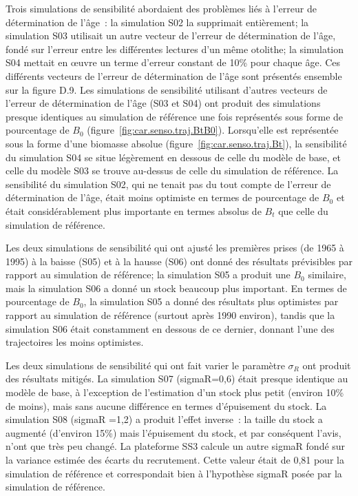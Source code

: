 \documentclass[11pt]{book}
\newcommand{\pc}{\%}
\begin{document}
Trois simulations de sensibilit\'{e} abordaient des probl\`{e}mes li\'{e}s \`{a} l'erreur de d\'{e}termination de l'\^{a}ge~: la simulation S02 la supprimait enti\`{e}rement; la simulation S03 utilisait un autre vecteur de l'erreur de d\'{e}termination de l'\^{a}ge, fond\'{e} sur l'erreur entre les diff\'{e}rentes lectures d'un m\^{e}me otolithe; la simulation S04 mettait en {\oe}uvre un terme d'erreur constant de 10\pc{} pour chaque \^{a}ge.
Ces diff\'{e}rents vecteurs de l'erreur de d\'{e}termination de l'\^{a}ge sont pr\'{e}sent\'{e}s ensemble sur la figure D.9.
Les simulations de sensibilit\'{e} utilisant d'autres vecteurs de l'erreur de d\'{e}termination de l'\^{a}ge (S03 et S04) ont produit des simulations presque identiques au simulation de r\'{e}f\'{e}rence une fois repr\'{e}sent\'{e}s sous forme de pourcentage de $B_0$ (figure~\ref{fig:car.senso.traj.BtB0}).
Lorsqu'elle est repr\'{e}sent\'{e}e sous la forme d'une biomasse absolue (figure~\ref{fig:car.senso.traj.Bt}), la sensibilit\'{e} du simulation S04 se situe l\'{e}g\`{e}rement en dessous de celle du mod\`{e}le de base, et celle du mod\`{e}le S03 se trouve au-dessus de celle du simulation de r\'{e}f\'{e}rence. La sensibilit\'{e} du simulation S02, qui ne tenait pas du tout compte de l'erreur de d\'{e}termination de l'\^{a}ge, \'{e}tait moins optimiste en termes de pourcentage de $B_0$ et \'{e}tait consid\'{e}rablement plus importante en termes absolus de $B_t$ que celle du simulation de r\'{e}f\'{e}rence.

Les deux simulations de sensibilit\'{e} qui ont ajust\'{e} les premi\`{e}res prises (de 1965 \`{a} 1995) \`{a} la baisse (S05) et \`{a} la hausse (S06) ont donn\'{e} des r\'{e}sultats pr\'{e}visibles par rapport au simulation de r\'{e}f\'{e}rence; la simulation S05 a produit une $B_0$ similaire, mais la simulation S06 a donn\'{e} un stock beaucoup plus important.
En termes de pourcentage de $B_0$, la simulation S05 a donn\'{e} des r\'{e}sultats plus optimistes par rapport au simulation de r\'{e}f\'{e}rence (surtout apr\`{e}s 1990 environ), tandis que la simulation S06 \'{e}tait constamment en dessous de ce dernier, donnant l'une des trajectoires les moins optimistes.

Les deux simulations de sensibilit\'{e} qui ont fait varier le param\`{e}tre $\sigma_R$ ont produit des r\'{e}sultats mitig\'{e}s.
La simulation S07 (sigmaR=0,6) \'{e}tait presque identique au mod\`{e}le de base, \`{a} l'exception de l'estimation d'un stock plus petit (environ 10\pc{} de moins), mais sans aucune diff\'{e}rence en termes d'\'{e}puisement du stock.
La simulation S08 (sigmaR =1,2) a produit l'effet inverse~: la taille du stock a augment\'{e} (d'environ 15\pc{}) mais l'\'{e}puisement du stock, et par cons\'{e}quent l'avis, n'ont que tr\`{e}s peu chang\'{e}.
La plateforme SS3 calcule un autre sigmaR fond\'{e} sur la variance estim\'{e}e des \'{e}carts du recrutement. 
Cette valeur \'{e}tait de 0,81 pour la simulation de r\'{e}f\'{e}rence et correspondait bien \`{a} l'hypoth\`{e}se sigmaR pos\'{e}e par la simulation de r\'{e}f\'{e}rence.
\end{document}

